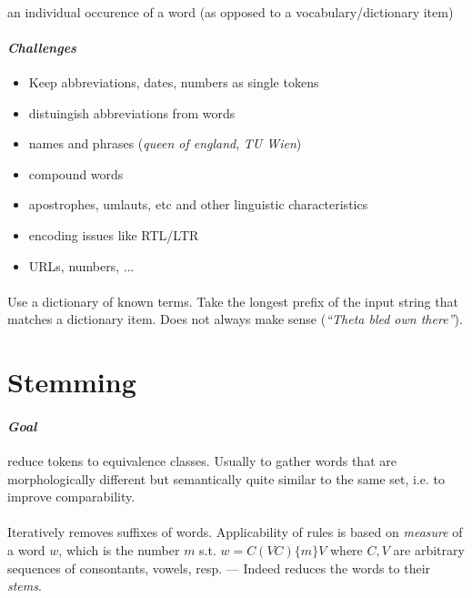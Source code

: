 \documentclass[10pt,twocolumn]{article}
\begin{document}
\paragraph{} an individual occurence of a word (as opposed to a
vocabulary/dictionary item)

\paragraph{\textit{Challenges}}
\begin{itemize}
\item Keep abbreviations, dates, numbers as single tokens
\item distuingish abbreviations from words
\item names and phrases (\textit{queen of england}, \textit{TU Wien})
\item compound words
\item apostrophes, umlauts, etc and other linguistic characteristics
\item encoding issues like RTL/LTR
\item URLs, numbers, ...
\end{itemize}

\paragraph{} Use a dictionary of known terms.
Take the longest prefix of the input string that matches a dictionary item. Does
not always make sense (\textit{``Theta bled own there''}).

\section{Stemming}

\paragraph{\textit{Goal}} reduce tokens to equivalence
classes. Usually to gather words that are morphologically different but
semantically quite similar to the same set, i.e. to improve comparability. 

\paragraph{ } Iteratively removes suffixes of words.
Applicability of rules is based on \textit{measure} of a word $w$, which is the
number $m$ s.t. $w=C(VC)\{m\}V$ where $C,V$ are arbitrary sequences of
consontants, vowels, resp. --- Indeed reduces the words to their \textit{stems}.
\end{document}
